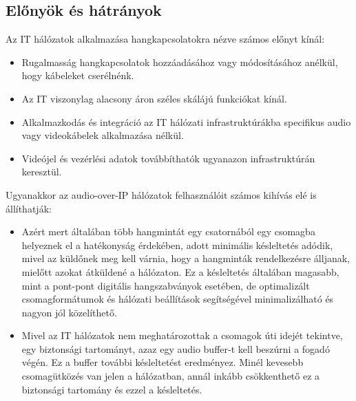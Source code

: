 \subsection{Előnyök és hátrányok}
Az IT hálózatok alkalmazása hangkapcsolatokra nézve számos előnyt kínál:
\begin{itemize}
	\item Rugalmasság hangkapcsolatok hozzáadásához vagy módosításához anélkül,
	      hogy kábeleket cserélnénk.
\end{itemize}
\begin{itemize}
	\item Az IT viszonylag alacsony áron széles skálájú funkciókat kínál.
\end{itemize}
\begin{itemize}
	\item Alkalmazkodás és integráció az IT hálózati infrastruktúrákba
	      specifikus audio vagy videokábelek alkalmazása nélkül.
\end{itemize}
\begin{itemize}
	\item Videójel és vezérlési adatok továbbíthatók ugyanazon infrastruktúrán
	      keresztül.
\end{itemize}
Ugyanakkor az audio-over-IP hálózatok felhasználóit számos kihívás elé is állíthatják:
\begin{itemize}
	\item Azért mert általában több hangmintát egy csatornából egy csomagba helyeznek
	      el a hatékonyság érdekében, adott minimális késleltetés adódik, mivel az
	      küldőnek meg kell várnia, hogy a hangminták rendelkezésre álljanak, mielőtt
	      azokat átküldené a hálózaton. Ez a késleltetés általában magasabb, mint a
	      pont-pont digitális hangszabványok esetében, de optimalizált csomagformátumok és
	      hálózati beállítások segítségével minimalizálható és nagyon jól közelíthető.
\end{itemize}
\begin{itemize}
	\item Mivel az IT hálózatok nem meghatározottak a csomagok úti idejét tekintve,
	      egy biztonsági tartományt, azaz egy audio buffer-t kell beszúrni a fogadó végén.
	      Ez a buffer további késleltetést eredményez. Minél kevesebb csomagütközés van
	      jelen a hálózatban, annál inkább csökkenthető ez a biztonsági tartomány és
	      ezzel a késleltetés.
\end{itemize}
